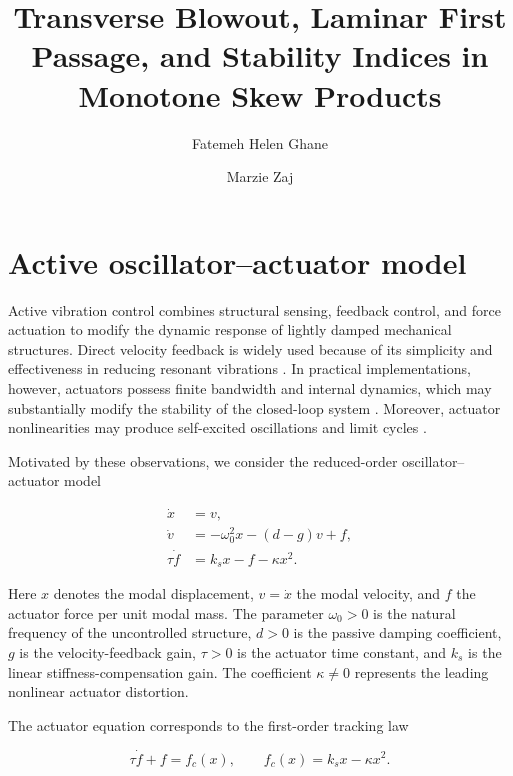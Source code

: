 \documentclass[11pt,reqno]{amsart}
\title[Transverse Blowout and Laminar First Passage]{Transverse Blowout, Laminar First Passage, and Stability Indices in Monotone Skew Products}
\author[F. H. Ghane]{Fatemeh Helen Ghane}
\author[M. Zaj]{Marzie Zaj}
\theoremstyle{plain}
\theoremstyle{definition}
\theoremstyle{remark}
\begin{document}
\maketitle


\begin{abstract}

\end{abstract}


\section{Active oscillator--actuator model}

Active vibration control combines structural sensing, feedback control,
and force actuation to modify the dynamic response of lightly damped
mechanical structures. Direct velocity feedback is widely used because of
its simplicity and effectiveness in reducing resonant vibrations
\cite{Balas1979,Preumont2018,Hirschfeldt2025}. In practical
implementations, however, actuators possess finite bandwidth and internal
dynamics, which may substantially modify the stability of the closed-loop
system \cite{GohCaughey1985}. Moreover, actuator nonlinearities may
produce self-excited oscillations and limit cycles
\cite{DalBorgo2020}.

Motivated by these observations, we consider the reduced-order
oscillator--actuator model

\begin{equation}
\label{eq:model}
\begin{aligned}
\dot x &= v,\\
\dot v &= -\omega_0^2x-(d-g)v+f,\\
\tau\dot f &= k_sx-f-\kappa x^2.
\end{aligned}
\end{equation}

Here $x$ denotes the modal displacement,
$v=\dot x$ the modal velocity,
and $f$ the actuator force per unit modal mass.
The parameter $\omega_0>0$ is the natural frequency of the uncontrolled
structure,
$d>0$ is the passive damping coefficient,
$g$ is the velocity-feedback gain,
$\tau>0$ is the actuator time constant,
and $k_s$ is the linear stiffness-compensation gain.
The coefficient $\kappa\neq0$ represents the leading nonlinear actuator
distortion.

The actuator equation corresponds to the first-order tracking law

\[
\tau\dot f+f=f_c(x),
\qquad
f_c(x)=k_sx-\kappa x^2.
\]
\end{document}
